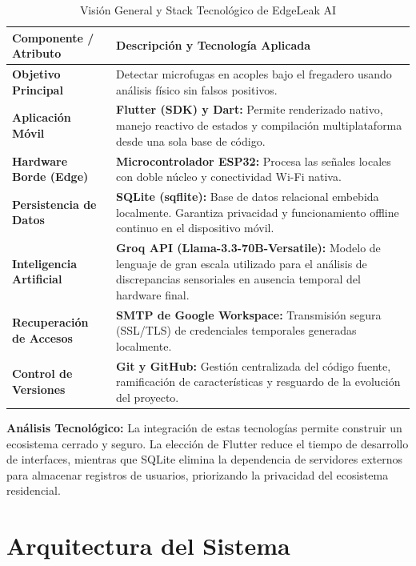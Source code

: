 \documentclass[11pt,a4paper]{article}
\begin{document}
\begin{table}[htpb]
    \centering
    \caption{Visión General y Stack Tecnológico de EdgeLeak AI}
    \begin{tabularx}{\textwidth}{>{\bfseries}l X}
        \toprule
        Componente / Atributo & Descripción y Tecnología Aplicada \\
        \midrule
        Objetivo Principal & Detectar microfugas en acoples bajo el fregadero usando análisis físico sin falsos positivos. \\
        Aplicación Móvil & \textbf{Flutter (SDK) y Dart:} Permite renderizado nativo, manejo reactivo de estados y compilación multiplataforma desde una sola base de código. \\
        Hardware Borde (Edge) & \textbf{Microcontrolador ESP32:} Procesa las señales locales con doble núcleo y conectividad Wi-Fi nativa. \\
        Persistencia de Datos & \textbf{SQLite (sqflite):} Base de datos relacional embebida localmente. Garantiza privacidad y funcionamiento offline continuo en el dispositivo móvil. \\
        Inteligencia Artificial & \textbf{Groq API (Llama-3.3-70B-Versatile):} Modelo de lenguaje de gran escala utilizado para el análisis de discrepancias sensoriales en ausencia temporal del hardware final. \\
        Recuperación de Accesos & \textbf{SMTP de Google Workspace:} Transmisión segura (SSL/TLS) de credenciales temporales generadas localmente. \\
        Control de Versiones & \textbf{Git y GitHub:} Gestión centralizada del código fuente, ramificación de características y resguardo de la evolución del proyecto. \\
        \bottomrule
    \end{tabularx}
\end{table}

\textbf{Análisis Tecnológico:} La integración de estas tecnologías permite construir un ecosistema cerrado y seguro. La elección de Flutter reduce el tiempo de desarrollo de interfaces, mientras que SQLite elimina la dependencia de servidores externos para almacenar registros de usuarios, priorizando la privacidad del ecosistema residencial.

\section{Arquitectura del Sistema}
\end{document}
